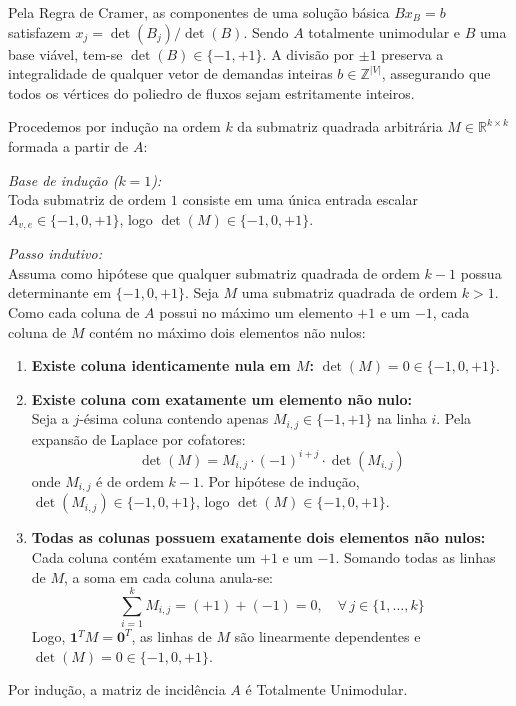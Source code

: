  Pela Regra de Cramer, as componentes de uma solução básica $B x_B = b$ satisfazem $x_j = \det(B_j) / \det(B)$. Sendo $A$ totalmente unimodular e $B$ uma base viável, tem-se $\det(B) \in \{-1, +1\}$. A divisão por $\pm 1$ preserva a integralidade de qualquer vetor de demandas inteiras $b \in \mathbb{Z}^{|V|}$, assegurando que todos os vértices do poliedro de fluxos sejam estritamente inteiros.

\begin{demonstracao}
Procedemos por indução na ordem $k$ da submatriz quadrada arbitrária $M \in \mathbb{R}^{k \times k}$ formada a partir de $A$:

\medskip
\noindent \textit{Base de indução ($k = 1$):} \\
Toda submatriz de ordem $1$ consiste em uma única entrada escalar $A_{v,e} \in \{-1, 0, +1\}$, logo $\det(M) \in \{-1, 0, +1\}$.

\medskip
\noindent \textit{Passo indutivo:} \\
Assuma como hipótese que qualquer submatriz quadrada de ordem $k-1$ possua determinante em $\{-1, 0, +1\}$. Seja $M$ uma submatriz quadrada de ordem $k > 1$. Como cada coluna de $A$ possui no máximo um elemento $+1$ e um $-1$, cada coluna de $M$ contém no máximo dois elementos não nulos:

\begin{enumerate}
    \item \textbf{Existe coluna identicamente nula em $M$:} $\det(M) = 0 \in \{-1, 0, +1\}$.

    \item \textbf{Existe coluna com exatamente um elemento não nulo:} \\
    Seja a $j$-ésima coluna contendo apenas $M_{i,j} \in \{-1, +1\}$ na linha $i$. Pela expansão de Laplace por cofatores:
    $$\det(M) = M_{i,j} \cdot (-1)^{i+j} \cdot \det(M_{i,j})$$
    onde $M_{i,j}$ é de ordem $k-1$. Por hipótese de indução, $\det(M_{i,j}) \in \{-1, 0, +1\}$, logo $\det(M) \in \{-1, 0, +1\}$.

    \item \textbf{Todas as colunas possuem exatamente dois elementos não nulos:} \\
    Cada coluna contém exatamente um $+1$ e um $-1$. Somando todas as linhas de $M$, a soma em cada coluna anula-se:
    $$\sum_{i=1}^k M_{i,j} = (+1) + (-1) = 0, \quad \forall\, j \in \{1, \dots, k\}$$
    Logo, $\mathbf{1}^T M = \mathbf{0}^T$, as linhas de $M$ são linearmente dependentes e $\det(M) = 0 \in \{-1, 0, +1\}$.
\end{enumerate}
Por indução, a matriz de incidência $A$ é Totalmente Unimodular.
\end{demonstracao}

